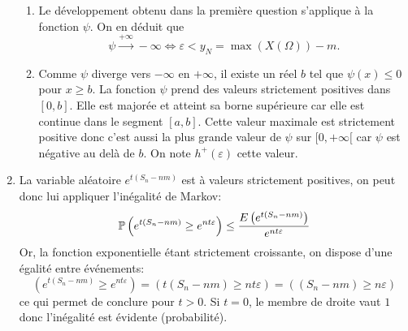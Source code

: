 \begin{enumerate}
\begin{enumerate}
 \item Le développement obtenu dans la première question s'applique à la fonction $\psi$. On en déduit que 
 \begin{displaymath}
  \psi \xrightarrow{+\infty} -\infty \Leftrightarrow \varepsilon < y_N = \max(X(\Omega)) - m.
 \end{displaymath}

 \item Comme $\psi$ diverge vers $-\infty$ en $+\infty$, il existe un réel $b$ tel que $\psi(x) \leq 0$ pour $x\geq b$. La fonction $\psi$ prend des valeurs strictement positives dans $[0,b]$. Elle est majorée et atteint sa borne supérieure car elle est continue dans le segment $[a,b]$. Cette valeur maximale est strictement positive donc c'est aussi la plus grande valeur de $\psi$ sur $[0,+\infty[$ car $\psi$ est négative au delà de $b$. On note $h^+(\varepsilon)$ cette valeur.  
\end{enumerate}

\item La variable aléatoire $e^{t(S_n-nm)}$ est à valeurs strictement positives, on peut donc lui appliquer l'inégalité de Markov:
\begin{displaymath}
 \mathbb{P}\left( e^{t(S_n-nm)} \geq e^{nt\varepsilon}\right) \leq \frac{E\left( e^{t(S_n-nm)}\right) }{e^{nt\varepsilon}} 
\end{displaymath}
Or, la fonction exponentielle étant strictement croissante, on dispose d'une égalité entre événements:
\begin{displaymath}
 \left( e^{t(S_n-nm)} \geq e^{nt\varepsilon}\right) =  \left( t(S_n-nm) \geq nt\varepsilon\right) = \left( (S_n-nm) \geq n\varepsilon\right)
\end{displaymath}
ce qui permet de conclure pour $t>0$. Si $t=0$, le membre de droite vaut $1$ donc l'inégalité est évidente (probabilité).


\end{enumerate}
